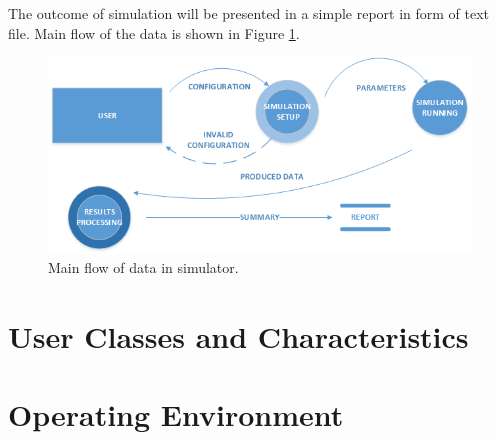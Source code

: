 	The outcome of simulation will be presented in a simple report in form of text file. Main flow of the data is shown in Figure \ref{fig:main-flow-of-data}.
	
	\begin{figure}
		\centering
		\includegraphics[width=\textwidth]{../visio-files/main-flow-of-data}
		\caption{Main flow of data in simulator.}
		\label{fig:main-flow-of-data}
	\end{figure}
\section{User Classes and Characteristics}

\section{Operating Environment}

